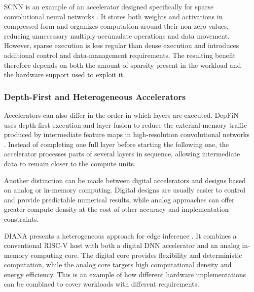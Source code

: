 SCNN is an example of an accelerator designed specifically for sparse
convolutional neural networks \cite{scnn}. It stores both weights and
activations in compressed form and organizes computation around their
non-zero values, reducing unnecessary multiply-accumulate operations
and data movement. However, sparse execution is less regular than
dense execution and introduces additional control and data-management
requirements. The resulting benefit therefore depends on both the
amount of sparsity present in the workload and the hardware support
used to exploit it.

\subsubsection{Depth-First and Heterogeneous Accelerators}

Accelerators can also differ in the order in which layers are
executed. DepFiN uses depth-first execution and layer fusion to reduce
the external memory traffic produced by intermediate feature maps in
high-resolution convolutional networks \cite{depfin}. Instead of
completing one full layer before starting the following one, the
accelerator processes parts of several layers in sequence, allowing
intermediate data to remain closer to the compute units.

Another distinction can be made between digital accelerators and
designs based on analog or in-memory computing. Digital designs are
usually easier to control and provide predictable numerical results,
while analog approaches can offer greater compute density at the cost
of other accuracy and implementation constraints.

DIANA presents a heterogeneous approach for edge inference
\cite{diana}. It combines a conventional RISC-V host with both a
digital DNN accelerator and an analog in-memory computing core. The
digital core provides flexibility and deterministic computation,
while the analog core targets high computational density and energy
efficiency. This is an example of how different hardware
implementations can be combined to cover workloads with different
requirements.


